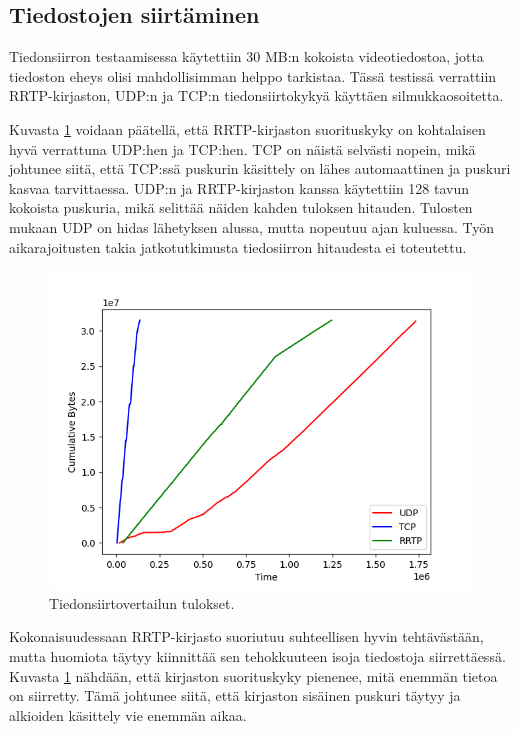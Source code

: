 \documentclass[a4paper,12pt]{article}
\begin{document}
    \subsection{Tiedostojen siirtäminen}


Tiedonsiirron testaamisessa käytettiin 30 MB:n kokoista videotiedostoa, jotta 
tiedoston eheys olisi mahdollisimman helppo tarkistaa.
Tässä testissä verrattiin RRTP-kirjaston, UDP:n ja TCP:n 
tiedonsiirtokykyä käyttäen silmukkaosoitetta. \par
Kuvasta \ref{fig:performance} voidaan päätellä, että 
RRTP-kirjaston suorituskyky on kohtalaisen hyvä verrattuna UDP:hen ja TCP:hen. TCP on näistä selvästi nopein, mikä johtunee siitä, että
TCP:ssä puskurin käsittely on lähes automaattinen ja puskuri kasvaa tarvittaessa. 
UDP:n ja RRTP-kirjaston kanssa käytettiin 128 tavun kokoista puskuria, mikä selittää näiden kahden tuloksen hitauden. Tulosten mukaan UDP on 
hidas lähetyksen alussa, mutta nopeutuu ajan kuluessa. Työn aikarajoitusten takia jatkotutkimusta tiedosiirron hitaudesta ei toteutettu. \par
    
    \begin{figure}[h!]
        \centering
        \includegraphics[width=\textwidth]{doc/latex/src/images/plot.png}
        \caption{Tiedonsiirtovertailun tulokset.}
        \label{fig:performance}
    \end{figure}

    
Kokonaisuudessaan RRTP-kirjasto suoriutuu suhteellisen hyvin tehtävästään, mutta huomiota täytyy kiinnittää sen tehokkuuteen isoja tiedostoja siirrettäessä. Kuvasta \ref{fig:performance} nähdään, että kirjaston suorituskyky pienenee, mitä enemmän tietoa on siirretty. Tämä johtunee siitä, että kirjaston sisäinen puskuri täytyy ja alkioiden käsittely vie enemmän aikaa.
\end{document}
